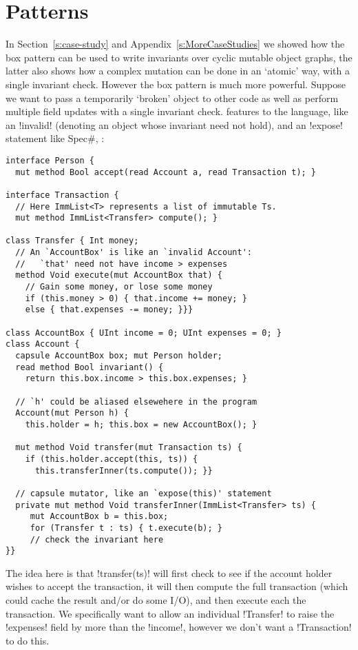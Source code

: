 \section{Patterns}
\label{s:patterns}
In Section~\ref{s:case-study} and Appendix~\ref{s:MoreCaseStudies} we showed how the box pattern can be used to write invariants over cyclic mutable object graphs, the latter also shows how a complex mutation can be done in an `atomic' way, with a single invariant check. However the box pattern is much more powerful. Suppose we want to pass a temporarily `broken' object to other code as well as perform multiple field updates with a single invariant check. 
  features
to the language, like an  \Q!invalid!  (denoting an object whose invariant need not hold), and an \Q!expose! statement like Spec\#, :
\begin{lstlisting}
interface Person {
  mut method Bool accept(read Account a, read Transaction t); }

interface Transaction { 
  // Here ImmList<T> represents a list of immutable Ts.
  mut method ImmList<Transfer> compute(); }

class Transfer { Int money;
  // An `AccountBox' is like an `invalid Account':
  //   `that' need not have income > expenses
  method Void execute(mut AccountBox that) {
    // Gain some money, or lose some money
    if (this.money > 0) { that.income += money; }
    else { that.expenses -= money; }}}

class AccountBox { UInt income = 0; UInt expenses = 0; }
class Account {
  capsule AccountBox box; mut Person holder;
  read method Bool invariant() {
    return this.box.income > this.box.expenses; }

  // `h' could be aliased elsewehere in the program    
  Account(mut Person h) { 
    this.holder = h; this.box = new AccountBox(); }

  mut method Void transfer(mut Transaction ts) {
    if (this.holder.accept(this, ts)) {
	  this.transferInner(ts.compute()); }}

  // capsule mutator, like an `expose(this)' statement
  private mut method Void transferInner(ImmList<Transfer> ts) {
     mut AccountBox b = this.box;
     for (Transfer t : ts) { t.execute(b); }
     // check the invariant here
}}
\end{lstlisting}
The idea here is that \Q!transfer(ts)! will first check to see if the account holder wishes to accept the transaction, it will then compute the full transaction (which could cache the result and/or do some I/O), and then execute each   the transaction. We specifically want to allow an individual \Q!Transfer! to raise the \Q!expenses! field by more than the \Q!income!, however we don't want a \Q!Transaction! to do this. 

